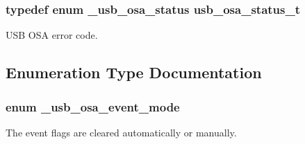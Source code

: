 \hypertarget{group__usb__os__abstraction_ga8de2fb7579de0a6621bbc1776519b0a9}{
\subsubsection[{usb\-\_\-osa\-\_\-status\-\_\-t}]{\setlength{\rightskip}{0pt plus 5cm}typedef enum {\bf \-\_\-usb\-\_\-osa\-\_\-status}  {\bf usb\-\_\-osa\-\_\-status\-\_\-t}}}\label{group__usb__os__abstraction_ga8de2fb7579de0a6621bbc1776519b0a9}


U\-S\-B O\-S\-A error code. 



\subsection{Enumeration Type Documentation}
\hypertarget{group__usb__os__abstraction_gaf3dc48c688f7c71cce122a1a0d4a12bd}{
\subsubsection[{\-\_\-usb\-\_\-osa\-\_\-event\-\_\-mode}]{\setlength{\rightskip}{0pt plus 5cm}enum {\bf \-\_\-usb\-\_\-osa\-\_\-event\-\_\-mode}}}\label{group__usb__os__abstraction_gaf3dc48c688f7c71cce122a1a0d4a12bd}


The event flags are cleared automatically or manually. 

